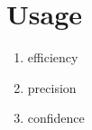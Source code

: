 \section{Usage}%
\label{sec:usage}



\begin{enumerate}
\item efficiency
\item precision
\item confidence
\end{enumerate}
